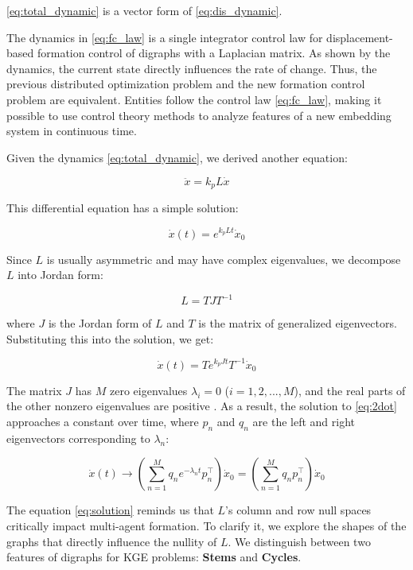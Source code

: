\documentclass[letterpaper, 10 pt, conference]{ieeeconf}  %
\begin{document}
\noindent \eqref{eq:total_dynamic} is a vector form of \eqref{eq:dis_dynamic}.

The dynamics in \eqref{eq:fc_law} is a single integrator control law for displacement-based formation control of digraphs with a Laplacian matrix. As shown by the dynamics, the current state directly influences the rate of change. Thus, the previous distributed optimization problem and the new formation control problem are equivalent. Entities follow the control law \eqref{eq:fc_law}, making it possible to use control theory methods to analyze features of a new embedding system in continuous time.

Given the dynamics \eqref{eq:total_dynamic}, we derived another equation:

\begin{equation}
    \ddot{x} = k_p L \dot{x}
    \label{eq:2dot}
\end{equation}

\noindent This differential equation has a simple solution:

\[ 
    \dot{x}(t) = e^{k_p Lt} \dot{x}_0 
\]

\noindent Since \( L \) is usually asymmetric and may have complex eigenvalues, we decompose \( L \) into Jordan form:

\[ 
    L = T J T^{-1} 
\]

\noindent where \( J \) is the Jordan form of \( L \) and \( T \) is the matrix of generalized eigenvectors. Substituting this into the solution, we get:

\[ 
    \dot{x}(t) = T e^{k_p J t} T^{-1} \dot{x}_0 
\]

\noindent The matrix \( J \) has \( M \) zero eigenvalues \( \lambda_i = 0 \) (\( i = 1,2,...,M \)), and the real parts of the other nonzero eigenvalues are positive \cite{mirzaev_laplacian_2013}. As a result, the solution to \eqref{eq:2dot} approaches a constant over time, where \( p_n \) and \( q_n \) are the left and right eigenvectors corresponding to \( \lambda_n \):

\begin{equation}
    \dot{x}(t) \rightarrow \left( \sum_{n=1}^M q_n e^{-\lambda_n t} p_n^\top \right) \dot{x}_0 = \left( \sum_{n=1}^M q_n p_n^\top \right) \dot{x}_0
    \label{eq:solution}
\end{equation}

\noindent The equation \eqref{eq:solution} reminds us that $L$'s column and row null spaces critically impact multi-agent formation. 
To clarify it, we explore the shapes of the graphs that directly influence the nullity of \( L \). We distinguish between two features of digraphs for KGE problems: \textbf{Stems} and \textbf{Cycles}.
\end{document}
